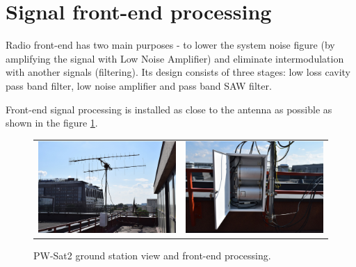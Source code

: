 \section{Signal front-end processing}
Radio front-end has two main purposes - to lower the system noise figure (by amplifying the signal with Low Noise Amplifier) and eliminate intermodulation with another signals (filtering). Its design consists of three stages: low loss cavity pass band filter, low noise amplifier and pass band SAW filter. 

Front-end signal processing is installed as close to the antenna as possible as shown in the figure \ref{elka_skrzynka}.

\begin{figure}
   \centering
\begin{tabular}{cc}
        \includegraphics[width=0.3\paperwidth]{img/5/elka_view.jpg}
    & 
        \includegraphics[width=0.3\paperwidth]{img/5/elka_skrzynka.jpg}
\end{tabular}
\label{elka_skrzynka}
\caption{PW-Sat2 ground station view and front-end processing.}
\end{figure}


